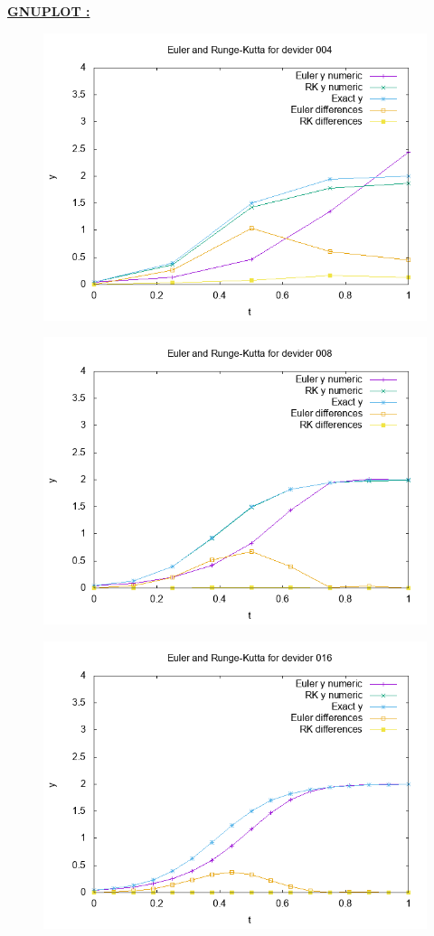 \documentclass[a4paper,10pt]{article}
\begin{document}
	\underline{\textbf{GNUPLOT : }}
	\begin{figure}[h!]
		\centering
		\includegraphics[width=0.7\linewidth]{plot004}
		\caption{}
		\label{fig:plot004}
	\end{figure}
	\begin{figure}[h!]
		\centering
		\includegraphics[width=0.7\linewidth]{plot008}
		\caption{}
		\label{fig:plot008}
	\end{figure}
	\begin{figure}[h!]
		\centering
		\includegraphics[width=0.7\linewidth]{plot016}
		\caption{}
		\label{fig:plot016}
	\end{figure}
\end{document}
